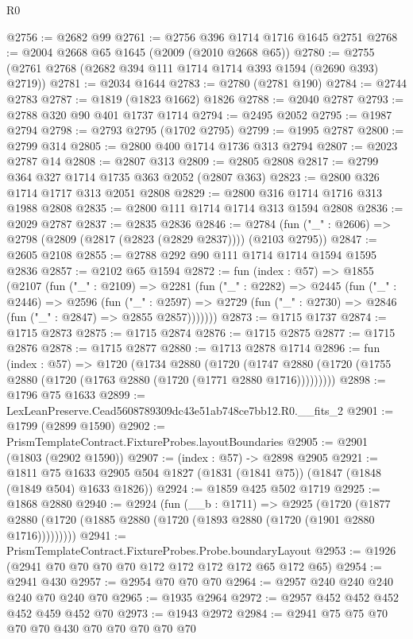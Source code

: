 \begin{lexlean}{R0}
\begin{coremodule}
@2756 := @2682 @99
@2761 := @2756 @396 @1714 @1716 @1645 @2751
@2768 := @2004 @2668 @65 @1645 (@2009 (@2010 @2668 @65))
@2780 := @2755 (@2761 @2768 (@2682 @394 @111 @1714 @1714 @393 @1594 (@2690 @393) @2719))
@2781 := @2034 @1644
@2783 := @2780 (@2781 @190)
@2784 := @2744 @2783
@2787 := @1819 (@1823 @1662) @1826
@2788 := @2040 @2787
@2793 := @2788 @320 @90 @401 @1737 @1714
@2794 := @2495 @2052
@2795 := @1987 @2794
@2798 := @2793 @2795 (@1702 @2795)
@2799 := @1995 @2787
@2800 := @2799 @314
@2805 := @2800 @400 @1714 @1736 @313 @2794
@2807 := @2023 @2787 @14
@2808 := @2807 @313
@2809 := @2805 @2808
@2817 := @2799 @364 @327 @1714 @1735 @363 @2052 (@2807 @363)
@2823 := @2800 @326 @1714 @1717 @313 @2051 @2808
@2829 := @2800 @316 @1714 @1716 @313 @1988 @2808
@2835 := @2800 @111 @1714 @1714 @313 @1594 @2808
@2836 := @2029 @2787
@2837 := @2835 @2836
@2846 := @2784 (fun ("_" : @2606) => @2798 (@2809 (@2817 (@2823 (@2829 @2837)))) (@2103 @2795))
@2847 := @2605 @2108
@2855 := @2788 @292 @90 @111 @1714 @1714 @1594 @1595 @2836
@2857 := @2102 @65 @1594
@2872 := fun (index : @57) =>
  @1855
    (@2107
      (fun ("_" : @2109) =>
      @2281
        (fun ("_" : @2282) =>
        @2445
          (fun ("_" : @2446) =>
          @2596
            (fun ("_" : @2597) =>
            @2729 (fun ("_" : @2730) => @2846 (fun ("_" : @2847) => @2855 @2857)))))))
@2873 := @1715 @1737
@2874 := @1715 @2873
@2875 := @1715 @2874
@2876 := @1715 @2875
@2877 := @1715 @2876
@2878 := @1715 @2877
@2880 := @1713 @2878 @1714
@2896 := fun (index : @57) =>
  @1720
    (@1734
      @2880
      (@1720 (@1747 @2880 (@1720 (@1755 @2880 (@1720 (@1763 @2880 (@1720 (@1771 @2880 @1716)))))))))
@2898 := @1796 @75 @1633
@2899 := LexLeanPreserve.Cead5608789309dc43e51ab748ce7bb12.R0.__fits_2
@2901 := @1799 (@2899 @1590)
@2902 := PrismTemplateContract.FixtureProbes.layoutBoundaries
@2905 := @2901 (@1803 (@2902 @1590))
@2907 := (index : @57) -> @2898 @2905
@2921 := @1811
    @75
    @1633
    @2905
    @504
    @1827
    (@1831 (@1841 @75))
    (@1847 (@1848 (@1849 @504) @1633 @1826))
@2924 := @1859 @425 @502 @1719
@2925 := @1868 @2880
@2940 := @2924
    (fun (__b : @1711) =>
    @2925
      (@1720 (@1877 @2880 (@1720 (@1885 @2880 (@1720 (@1893 @2880 (@1720 (@1901 @2880 @1716)))))))))
@2941 := PrismTemplateContract.FixtureProbes.Probe.boundaryLayout
@2953 := @1926 (@2941 @70 @70 @70 @70 @172 @172 @172 @172 @65 @172 @65)
@2954 := @2941 @430
@2957 := @2954 @70 @70 @70
@2964 := @2957 @240 @240 @240 @240 @70 @240 @70
@2965 := @1935 @2964
@2972 := @2957 @452 @452 @452 @452 @459 @452 @70
@2973 := @1943 @2972
@2984 := @2941 @75 @75 @70 @70 @70 @430 @70 @70 @70 @70 @70

\end{coremodule}
\end{lexlean}
